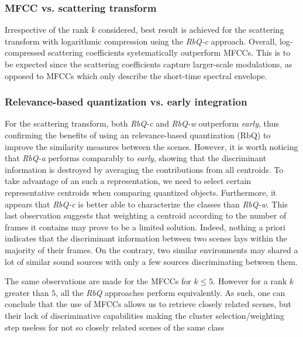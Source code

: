 \documentclass[journal]{IEEEtran}
\makeatletter
\newcommand*{\vs}{vs.\@\xspace}
\newcommand{\ja}[1]{\textcolor{magenta}{Joakim : #1}}
\makeatother
\begin{document}
\subsubsection*{MFCC \vs scattering transform}

Irrespective of the rank $k$ considered, best result is achieved for the scattering transform with logarithmic compression using the \emph{RbQ-c} approach. Overall, log-compressed scattering coefficients systematically outperform MFCCs. This is to be expected since the scattering coefficients capture larger-scale modulations, as opposed to MFCCs which only describe the short-time spectral envelope.

\subsubsection*{Relevance-based quantization \vs early integration}

For the scattering transform, both \emph{RbQ-c} and \emph{RbQ-w} outperform \emph{early}, thus confirming the benefits of using an relevance-based quantization (RbQ) to improve the similarity measures between the scenes. However, it is worth noticing that \emph{RbQ-a} performs comparably to \emph{early}, showing that the discriminant information is destroyed by averaging the contributions from all centroids. To take advantage of an such a representation, we need to select certain representative centroids when comparing quantized objects. Furthermore, it appears that \emph{RbQ-c} is better able to characterize the classes than \emph{RbQ-w}. This last observation suggests that weighting a centroid according to the number of frames it contains may prove to be a limited solution. Indeed, nothing a priori indicates that the discriminant information between two scenes lays within the majority of their frames. On the contrary, two similar environments may shared a lot of similar sound sources with only a few sources discriminating between them.

The same observations are made for the MFCCs for $k\leq5$. However for a rank $k$ greater than $5$, all the \emph{RbQ} approaches perform equivalently. As such, one can conclude that the use of MFCCs allows us to retrieve closely related scenes, but their lack of discriminative capabilities making the cluster selection/weighting step useless for not so closely related scenes of the same class

	
\end{document}
